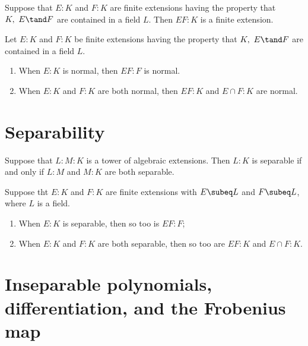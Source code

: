 \documentclass[a4paper]{article}
\begin{document}
\begin{tproposition}
  Suppose that \( E:K \) and \( F:K \) are finite extensions having the property that \( K,\ E\tand F \) are contained in a field \( L \).
  Then \( EF:K \) is a finite extension.
\end{tproposition}

\begin{ttheorem}
  Let \( E:K \) and \( F:K \) be finite extensions having the property that \( K,\ E\tand F \) are contained in a field \( L \). \begin{enumerate}[label=(\alph*)]
    \item When \( E:K \) is normal, then \( EF:F \) is normal.
    \item When \( E:K \) and \( F:K \) are both normal, then \( EF:K \) and \( E\cap F:K \) are normal.
  \end{enumerate}
\end{ttheorem}


\section{Separability} %
\setcounter{tdefinition}{24}

\begin{ttheorem}
  Suppose that \( L:M:K \) is a tower of algebraic extensions.
  Then \( L:K \) is separable if and only if \( L:M \) and \( M:K \) are both separable.
\end{ttheorem}

\begin{ttheorem}
  Suppose tht \( E:K \) and \( F:K \) are finite extensions with \( E\subeq L \) and \( F\subeq L \), where \( L \) is a field.
  \begin{enumerate}[label=(\alph*)]
    \item When \( E:K \) is separable, then so too is \( EF:F \);
    \item When \( E:K \) and \( F:K \) are both separable, then so too are \( EF:K \) and \( E\cap F:K \).
  \end{enumerate}
\end{ttheorem}

\section{Inseparable polynomials, differentiation, and the Frobenius map}
\end{document}
